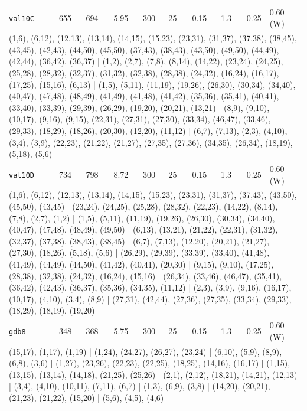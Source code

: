 \begin{longtable}{lrrrrrrrrl}
\texttt{val10C} & 655 & 694 & 5.95 & 300 & 25 & 0.15 & 1.3 & 0.25 & 0.60\,(W) \\
\multicolumn{10}{p{0.96\linewidth}}{\tiny\raggedright\arraybackslash (1,6), (6,12), (12,13), (13,14), (14,15), (15,23), (23,31), (31,37), (37,38), (38,45), (43,45), (42,43), (44,50), (45,50), (37,43), (38,43), (43,50), (49,50), (44,49), (42,44), (36,42), (36,37) | (1,2), (2,7), (7,8), (8,14), (14,22), (23,24), (24,25), (25,28), (28,32), (32,37), (31,32), (32,38), (28,38), (24,32), (16,24), (16,17), (17,25), (15,16), (6,13) | (1,5), (5,11), (11,19), (19,26), (26,30), (30,34), (34,40), (40,47), (47,48), (48,49), (41,49), (41,48), (41,42), (35,36), (35,41), (40,41), (33,40), (33,39), (29,39), (26,29), (19,20), (20,21), (13,21) | (8,9), (9,10), (10,17), (9,16), (9,15), (22,31), (27,31), (27,30), (33,34), (46,47), (33,46), (29,33), (18,29), (18,26), (20,30), (12,20), (11,12) | (6,7), (7,13), (2,3), (4,10), (3,4), (3,9), (22,23), (21,22), (21,27), (27,35), (27,36), (34,35), (26,34), (18,19), (5,18), (5,6)} \\[2pt]
\texttt{val10D} & 734 & 798 & 8.72 & 300 & 25 & 0.15 & 1.3 & 0.25 & 0.60\,(W) \\
\multicolumn{10}{p{0.96\linewidth}}{\tiny\raggedright\arraybackslash (1,6), (6,12), (12,13), (13,14), (14,15), (15,23), (23,31), (31,37), (37,43), (43,50), (45,50), (43,45) | (23,24), (24,25), (25,28), (28,32), (22,23), (14,22), (8,14), (7,8), (2,7), (1,2) | (1,5), (5,11), (11,19), (19,26), (26,30), (30,34), (34,40), (40,47), (47,48), (48,49), (49,50) | (6,13), (13,21), (21,22), (22,31), (31,32), (32,37), (37,38), (38,43), (38,45) | (6,7), (7,13), (12,20), (20,21), (21,27), (27,30), (18,26), (5,18), (5,6) | (26,29), (29,39), (33,39), (33,40), (41,48), (41,49), (44,49), (44,50), (41,42), (40,41), (20,30) | (9,15), (9,10), (17,25), (28,38), (32,38), (24,32), (16,24), (15,16) | (26,34), (33,46), (46,47), (35,41), (36,42), (42,43), (36,37), (35,36), (34,35), (11,12) | (2,3), (3,9), (9,16), (16,17), (10,17), (4,10), (3,4), (8,9) | (27,31), (42,44), (27,36), (27,35), (33,34), (29,33), (18,29), (18,19), (19,20)} \\[2pt]
\texttt{gdb8} & 348 & 368 & 5.75 & 300 & 25 & 0.15 & 1.3 & 0.25 & 0.60\,(W) \\
\multicolumn{10}{p{0.96\linewidth}}{\tiny\raggedright\arraybackslash (15,17), (1,17), (1,19) | (1,24), (24,27), (26,27), (23,24) | (6,10), (5,9), (8,9), (6,8), (3,6) | (1,27), (23,26), (22,23), (22,25), (18,25), (14,16), (16,17) | (1,15), (13,15), (13,14), (14,18), (21,25), (25,26) | (2,1), (2,12), (18,21), (14,21), (12,13) | (3,4), (4,10), (10,11), (7,11), (6,7) | (1,3), (6,9), (3,8) | (14,20), (20,21), (21,23), (21,22), (15,20) | (5,6), (4,5), (4,6)} \\[2pt]

\end{longtable}
